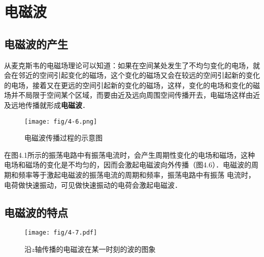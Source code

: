 \section{电磁波}
\subsection{电磁波的产生}

从麦克斯韦的电磁场理论可以知道：如果在空间某处发生了不均匀变化的电场，就会在邻近的空间引起变化的磁场，这个变化的磁场又会在较远的空间引起新的变化的电场，接着又在更远的空间引起新的变化的磁场，这样，变化的电场和变化的磁场并不局限于空间某个区域，而要由近及远向周围空间传播开去，电磁场这样由近及远地传播就形成\textbf{电磁波}．
\begin{figure}[htp]\centering
\texttt{[image: fig/4-6.png]}
\caption{电磁波传播过程的示意图}
\end{figure}

在图4.1所示的振荡电路中有振荡电流时，会产生周期性变化的电场和磁场，这种电场和磁场的变化是不均匀的，因而会激起电磁波向外传播（图4.6）．电磁波的周期和频率等于激起电磁波的振荡电流的周期和频率，振荡电路中有振荡
电流时，电荷做快速振动，可见做快速振动的电荷会激起电磁波．

\subsection{电磁波的特点}
\begin{figure}[htp]\centering
\texttt{[image: fig/4-7.pdf]}
\caption{沿$z$轴传播的电磁波在某一时刻的波的图象}
\end{figure}

